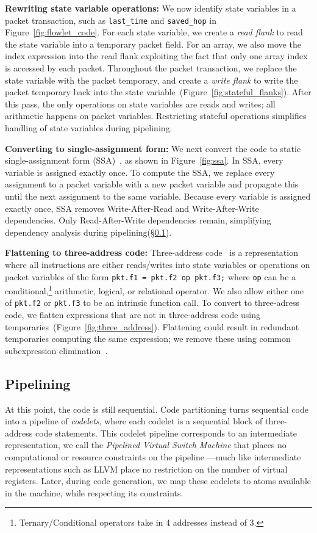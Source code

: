 \textbf{Rewriting state variable operations: }We now identify state variables
in a packet transaction, such as \texttt{last\_time} and \texttt{saved\_hop} in
Figure~\ref{fig:flowlet_code}.  For each state variable, we create a
\textit{read flank} to read the state variable into a temporary packet field.
For an array, we also move the index expression into the read flank exploiting
the fact that only one array index is accessed by each packet.  Throughout the
packet transaction, we replace the state variable with the packet temporary,
and create a \textit{write flank} to write the packet temporary back into the
state variable~(Figure~\ref{fig:stateful_flanks}). After this pass, the only
operations on state variables are reads and writes; all arithmetic happens on
packet variables. Restricting stateful operations simplifies handling of state
variables during pipelining.

\textbf{Converting to single-assignment form: }We next convert the code to
static single-assignment form (SSA)~\cite{ssa}, as shown in
Figure~\ref{fig:ssa}. In SSA, every variable is assigned exactly once. To
compute the SSA, we replace every assignment to a packet variable with a new
packet variable and propagate this until the next assignment to the same
variable.  Because every variable is assigned exactly once, SSA removes
Write-After-Read and Write-After-Write dependencies.  Only Read-After-Write
dependencies remain, simplifying dependency analysis during
pipelining(\S\ref{ss:partitioning}).

\textbf{Flattening to three-address code: } Three-address code~\cite{tac} is a
representation where all instructions are either reads/writes into state
variables or operations on packet variables of the form \texttt{pkt.f1 = pkt.f2
op pkt.f3;} where \texttt{op} can be a
conditional,\footnote{Ternary/Conditional operators take in 4 addresses instead
of 3.} arithmetic, logical, or relational operator.  We also allow either one
of {\tt pkt.f2} or {\tt pkt.f3} to be an intrinsic function call.  To convert
to three-adress code, we flatten expressions that are not in three-address code
using temporaries~(Figure~\ref{fig:three_address}).  Flattening could result in
redundant temporaries computing the same expression; we remove these using
common subexpression elimination~\cite{cse}.

\subsection{Pipelining}
\label{ss:partitioning}
At this point, the code is still sequential. Code partitioning turns sequential
code into a pipeline of \textit{codelets}, where each codelet is a sequential
block of three-address code statements. This codelet pipeline corresponds to an
intermediate representation, we call the \textit{Pipelined Virtual Switch
Machine} that places no computational or resource constraints on the pipeline
---much like intermediate representations such as LLVM place no restriction on
the number of virtual registers. Later, during code generation, we map these
codelets to atoms available in the \absmachine machine, while respecting its
constraints.

